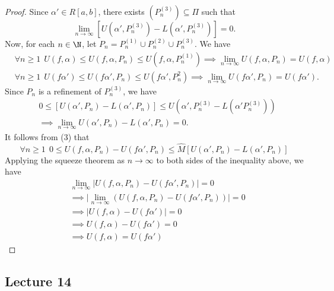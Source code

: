 \begin{proof}
Since \( \alpha' \in R[a,b] \), there exists \( ({P}_{n}^{(3)}) \subseteq \Pi  \) such that 
\[  \lim_{ n \to \infty } [U(\alpha', {P}_{n}^{(3)}) - L(\alpha', {P}_{n}^{(3)})]  = 0.   \]
Now, for each \( n \in \N \), let \( {P}_{n} = {P}_{n}^{(1)} \cup {P}_{n}^{(2)} \cup {P}_{n}^{(3)} \). We have
\begin{align*}
    &\forall n \geq 1 \ \  U(f,\alpha) \leq U(f,\alpha,{P}_{n}) \leq U(f,\alpha, {P}_{n}^{(1)}) \implies \lim_{ n \to \infty  } U(f,\alpha, {P}_{n})  = U(f,\alpha) \tag{4} \\
    &\forall n \geq 1 \ \ U(f \alpha') \leq U(f \alpha' , {P}_{n}) \leq U(f \alpha' , {P}_{n}^{2}) \implies \lim_{ n \to \infty  }  U(f \alpha', {P}_{n}) = U(f \alpha'). \tag{5}
\end{align*}
Since \( {P}_{n} \) is a refinement of \( {P}_{n}^{(3)} \), we have
\begin{align*}
     &0 \leq [U(\alpha', {P}_{n}) - L(\alpha',{P}_{n})] \leq U(\alpha' , {P}_{n}^{(3)} - L(\alpha' {P}_{n}^{(3)})) \\
     &\implies \lim_{ n \to \infty  } U(\alpha', {P}_{n}) - L(\alpha', {P}_{n}) = 0. \tag{6} 
\end{align*}
It follows from (3) that
\[  \forall n \geq 1 \ \ 0 \leq U(f,\alpha, {P}_{n}) - U(f \alpha' , {P}_{n}) \leq \hat{M} [U(\alpha', {P}_{n}) - L(\alpha', {P}_{n})] \]
Applying the squeeze theorem as \( n \to \infty   \) to both sides of the inequality above, we have
\begin{align*}
&\lim_{ n \to \infty   } | U(f,\alpha, {P}_{n}) - U(f \alpha' , {P}_{n}) |  = 0   \\
&\implies \Big| \lim_{ n \to \infty  }  (U(f,\alpha, {P}_{n}) - U(f \alpha', {P}_{n})) \Big| = 0 \\
&\implies | U(f,\alpha) - U(f \alpha') |  = 0 \\
&\implies U(f,\alpha) - U(f \alpha') = 0 \\
&\implies U(f,\alpha) = U(f \alpha')
\end{align*}
\end{proof}


\subsection{Lecture 14}

